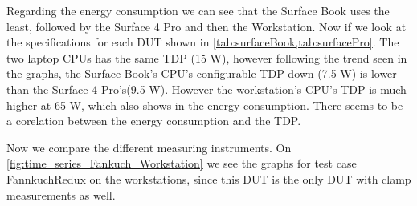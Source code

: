 

Regarding the energy consumption we can see that the Surface Book uses the least, followed by the Surface 4 Pro and then the Workstation. Now if we look at the specifications for each DUT shown in \cref{tab:surfaceBook,tab:surfacePro}. The two laptop CPUs has the same TDP (15 W), however following the trend seen in the graphs, the Surface Book's CPU's configurable TDP-down (7.5 W) is lower than the Surface 4 Pro's(9.5 W). However the workstation's CPU's TDP is much higher at 65 W, which also shows in the energy consumption. There seems to be a corelation between the energy consumption and the TDP.\nytafsnit


Now we compare the different measuring instruments. On \cref{fig:time_series_Fankuch_Workstation} we see the graphs for test case FannkuchRedux on the workstations, since this DUT is the only DUT with clamp measurements as well. 










